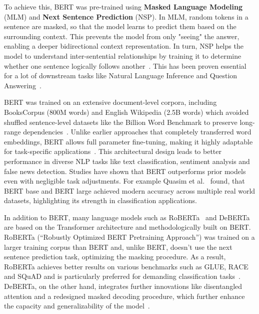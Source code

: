 To achieve this, BERT was pre-trained using \textbf{Masked Language Modeling} (MLM) and \textbf{Next Sentence Prediction} (NSP). In MLM, random tokens in a sentence are masked, so that the model learns to predict them based on the surrounding context. This prevents the model from only "seeing" the answer, enabling a deeper bidirectional context representation. In turn, NSP helps the model to understand inter-sentential relationships by training it to determine whether one sentence logically follows another~\cite{devlin2019bert}. This has been proven essential for a lot of downstream tasks like Natural Language Inference and Question Answering~\cite{sun2020finetuneberttextclassification}.

BERT was trained on an extensive document-level corpora, including BooksCorpus (800M words) and English Wikipedia (2.5B words) which avoided shuffled sentence-level datasets like the Billion Word Benchmark to preserve long-range dependencies~\cite{devlin2019bert}. Unlike earlier approaches that completely transferred word embeddings, BERT allows full parameter fine-tuning, making it highly adaptable for task-specific applications~\cite{korootev2021BERT}. This architectural design leads to better performance in diverse NLP tasks like text classification, sentiment analysis and false news detection. Studies have shown that BERT outperforms prior models even with negligible task adjustments. For example Quasim et al.~\cite{qasim2022fine} found, that BERT base and BERT large achieved modern accuracy across multiple real world datasets, highlighting its strength in classification applications.

In addition to BERT, many language models such as RoBERTa~\cite{liu2019roberta} and DeBERTa~\cite{he2021deberta} are based on the Transformer architecture and methodologically built on BERT. RoBERTa (“Robustly Optimized BERT Pretraining Approach”) was trained on a larger training corpus than BERT and, unlike BERT, doesn't use the next sentence prediction task, optimizing the masking procedure. As a result, RoBERTa achieves better results on various benchmarks such as GLUE, RACE and SQuAD and is particularly preferred for demanding classification tasks~\cite{liu2019roberta}. DeBERTa, on the other hand, integrates further innovations like disentangled attention and a redesigned masked decoding procedure, which further enhance the capacity and generalizability of the model~\cite{he2021deberta, he2023debertav3}.


